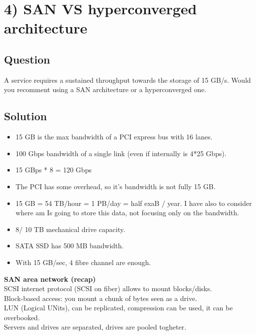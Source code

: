 \hypertarget{san-vs-hyperconverged-architecture}{%
\section{4) SAN VS hyperconverged
architecture}\label{san-vs-hyperconverged-architecture}}

\hypertarget{question-3}{%
\subsection{Question}\label{question-3}}

A service requires a sustained throughput towards the storage of 15
GB/s. Would you recomment using a SAN architecture or a hyperconverged
one.

\hypertarget{solution-3}{%
\subsection{Solution}\label{solution-3}}

\begin{itemize}
\item
  15 GB is the max bandwidth of a PCI express bus with 16 lanes.
\item
  100 Gbps bandwidth of a single  link (even if internally is 4*25 Gbps).
\item
  15 GBps * 8 = 120 Gbps
\item
  The PCI has some overhead, so it's bandwidth is not fully 15 GB.
\item
  15 GB = 54 TB/hour = 1 PB/day = half exaB / year. I have also to
  consider where am Is going to store this data, not focusing only on
  the bandwidth.
\item
  8/ 10 TB mechanical drive capacity.
\item
  SATA SSD has 500 MB bandwidth.\\
\item
  With 15 GB/sec, 4 fibre channel are enough.
\end{itemize}

\textbf{SAN area network (recap)}\\
SCSI internet protocol (SCSI on fiber) allows to mount blocks/disks.\\
Block-based access: you mount a chunk of bytes seen as a drive.\\
LUN (Logical UNits), can be replicated, compression can be used, it can
be overbooked.\\
Servers and drives are separated, drives are pooled togheter.


